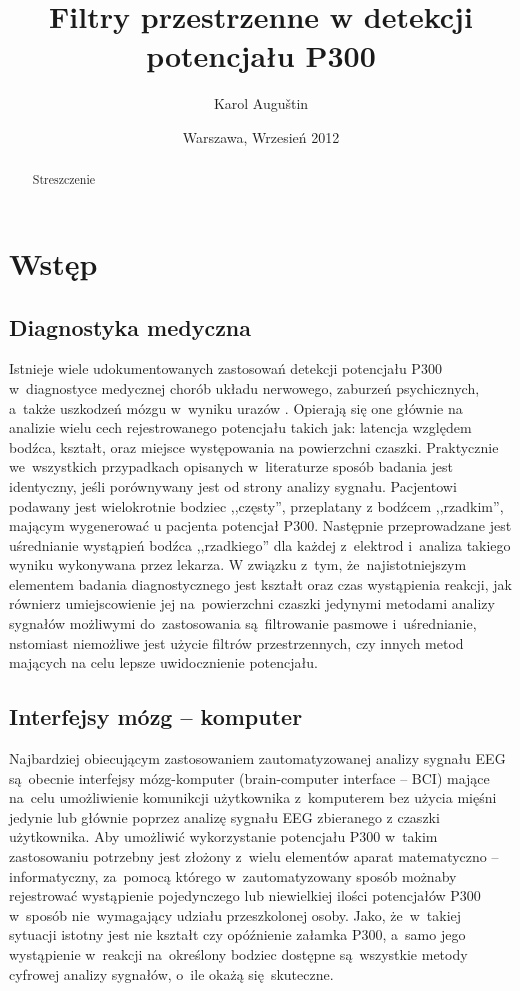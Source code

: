 \documentclass[licencjacka,openright]{pracamgr}
\author{ Karol Auguštin }
\title{ Filtry przestrzenne w detekcji potencjału P300 }
\date{Warszawa, Wrzesień 2012}
\begin{document}
\let\cleardoublepage\clearpage
\maketitle
\begin{abstract}
\par Streszczenie
\end{abstract}
\tableofcontents

\chapter{Wstęp}
\section{Diagnostyka medyczna}
Istnieje wiele udokumentowanych zastosowań detekcji potencjału P300 w~diagnostyce medycznej chorób układu nerwowego, zaburzeń psychicznych, a~także uszkodzeń mózgu w~wyniku urazów \citep{zgorzalewicz2000}. Opierają się one głównie na analizie wielu cech rejestrowanego potencjału takich jak: latencja względem bodźca, kształt, oraz miejsce występowania na powierzchni czaszki. Praktycznie we~wszystkich przypadkach opisanych w~literaturze sposób badania jest identyczny, jeśli porównywany jest od strony analizy sygnału. Pacjentowi podawany jest wielokrotnie bodziec ,,częsty'', przeplatany z bodźcem ,,rzadkim'', mającym wygenerować u pacjenta potencjał P300. Następnie przeprowadzane jest uśrednianie wystąpień bodźca ,,rzadkiego'' dla każdej z~elektrod i~analiza takiego wyniku wykonywana przez lekarza. W związku z~tym, że~najistotniejszym elementem badania diagnostycznego jest kształt oraz czas wystąpienia reakcji, jak równierz umiejscowienie jej na~powierzchni czaszki jedynymi metodami analizy sygnałów możliwymi do~zastosowania są~filtrowanie pasmowe i~uśrednianie, nstomiast niemożliwe jest użycie filtrów przestrzennych, czy innych metod mających na celu lepsze uwidocznienie potencjału.
\section{Interfejsy mózg -- komputer}
Najbardziej obiecującym zastosowaniem zautomatyzowanej analizy sygnału EEG są~obecnie interfejsy mózg-komputer (brain-computer interface -- BCI) mające na~celu umożliwienie komunikcji użytkownika z~komputerem bez użycia mięśni jedynie lub głównie poprzez analizę sygnału EEG zbieranego z czaszki użytkownika. Aby umożliwić wykorzystanie potencjału P300 w~takim zastosowaniu potrzebny jest złożony z~wielu elementów aparat matematyczno -- informatyczny, za~pomocą którego w~zautomatyzowany sposób możnaby rejestrować wystąpienie pojedynczego lub niewielkiej ilości potencjałów P300 w~sposób nie~wymagający udziału przeszkolonej osoby. Jako, że~w~takiej sytuacji istotny jest nie kształt czy opóźnienie załamka P300, a~samo jego wystąpienie w~reakcji na~określony bodziec dostępne są~wszystkie metody cyfrowej analizy sygnałów, o~ile okażą się~skuteczne.
\end{document}
